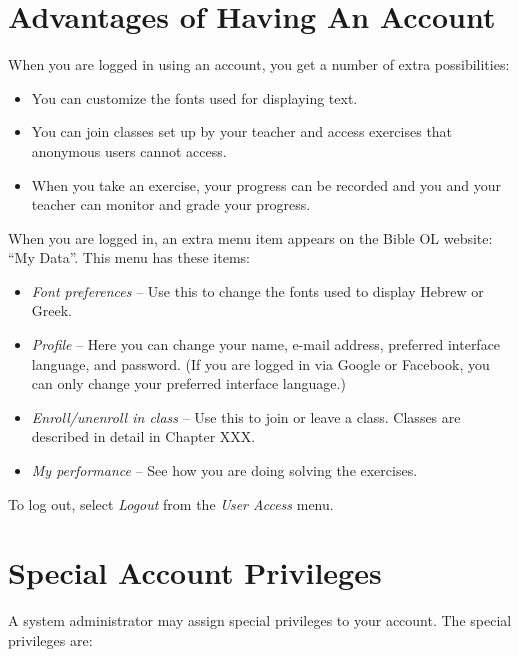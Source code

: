 \documentclass[11pt,oneside,a4paper]{memoir}
\begin{document}
\section{Advantages of Having An Account}

When you are logged in using an account, you get a number of extra possibilities:

\begin{itemize}
\item You can customize the fonts used for displaying text.
\item You can join classes set up by your teacher and access exercises that anonymous users cannot
  access.
\item When you take an exercise, your progress can be recorded and you and your teacher can monitor
  and grade your progress.
\end{itemize}

When you are logged in, an extra menu item appears on the Bible OL website: ``My Data''. This menu
has these items:

\begin{itemize}
\item \emph{Font preferences} -- Use this to change the fonts used to display Hebrew or Greek.
\item \emph{Profile} -- Here you can change your name, e-mail address, preferred interface language,
  and password. (If you are logged in via Google or Facebook, you can only change your preferred
  interface language.)
\item \emph{Enroll/unenroll in class} -- Use this to join or leave a class. Classes are described in
  detail in Chapter XXX.
\item \emph{My performance} -- See how you are doing solving the exercises.
\end{itemize}


To log out, select \emph{Logout} from the \emph{User Access} menu.


\section{Special Account Privileges}

A system administrator may assign special privileges to your account. The special privileges are:
\end{document}
